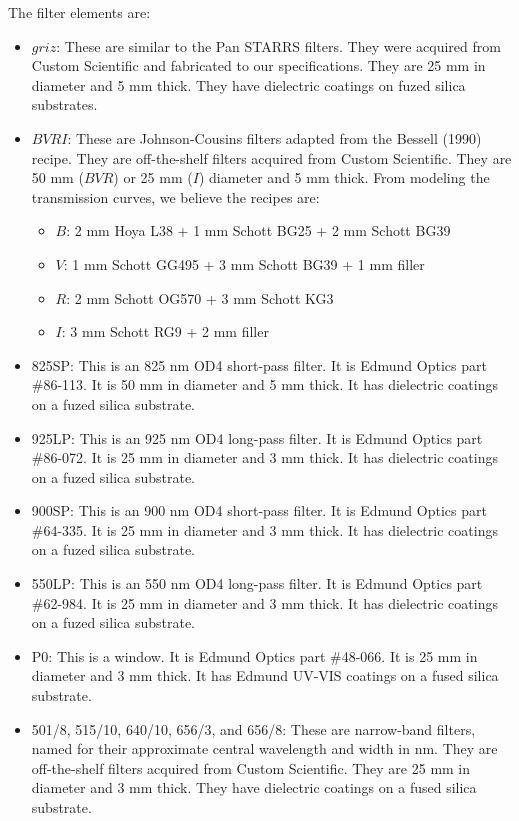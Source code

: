 The filter elements are:

\begin{itemize}
\item $griz$: These are similar to the Pan STARRS filters. They were acquired from Custom Scientific and fabricated to our specifications. They are 25 mm in diameter and 5 mm thick. They have dielectric coatings on fuzed silica substrates.
\item $BVRI$: These are Johnson-Cousins filters adapted from the Bessell (1990) recipe. They are off-the-shelf filters acquired from Custom Scientific. They are 50 mm ($BVR$) or 25 mm ($I$) diameter and 5 mm thick.
From modeling the transmission curves, we believe the recipes are:
\begin{itemize}
\item $B$: 2 mm Hoya L38 + 1 mm Schott BG25 + 2 mm Schott BG39
\item $V$: 1 mm Schott GG495 + 3 mm Schott BG39 + 1 mm filler
\item $R$: 2 mm Schott OG570 + 3 mm Schott KG3
\item $I$: 3 mm Schott RG9 + 2 mm filler
\end{itemize}
\item 825SP: This is an 825 nm OD4 short-pass filter. It is Edmund Optics part \#86-113. It is 50 mm in diameter and 5 mm thick. It has  dielectric coatings on a fuzed silica substrate.
\item 925LP: This is an 925 nm OD4 long-pass filter. It is Edmund Optics part \#86-072. It is 25 mm in diameter and 3 mm thick. It has  dielectric coatings on a fuzed silica substrate.
\item 900SP: This is an 900 nm OD4 short-pass filter. It is Edmund Optics part \#64-335. It is 25 mm in diameter and 3 mm thick. It has  dielectric coatings on a fuzed silica substrate.
\item 550LP: This is an 550 nm OD4 long-pass filter. It is Edmund Optics part \#62-984. It is 25 mm in diameter and 3 mm thick. It has dielectric coatings on a fuzed silica substrate.
\item P0: This is a window. It is Edmund Optics part \#48-066. It is 25 mm in diameter and 3 mm thick. It has Edmund UV-VIS coatings on a fused silica substrate.
\item 501/8, 515/10, 640/10, 656/3, and 656/8: These are narrow-band filters, named for their approximate central wavelength and width in nm. They are off-the-shelf filters acquired from Custom Scientific. They are 25 mm in diameter and 3 mm thick. They have dielectric coatings on a fused silica substrate.


\end{itemize}
